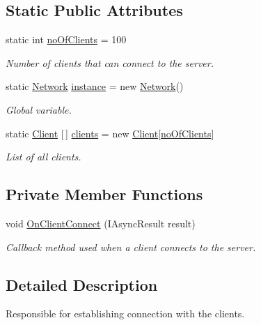 \subsection*{Static Public Attributes}
\begin{DoxyCompactItemize}
\item 
static int \mbox{\hyperlink{class_network_a728ae99fddeb1561e1e521d134d92582}{no\+Of\+Clients}} = 100
\begin{DoxyCompactList}\small\item\em Number of clients that can connect to the server. \end{DoxyCompactList}\item 
static \mbox{\hyperlink{class_network}{Network}} \mbox{\hyperlink{class_network_af63d25c25873f9220c94d6250a1c9242}{instance}} = new \mbox{\hyperlink{class_network}{Network}}()
\begin{DoxyCompactList}\small\item\em Global variable. \end{DoxyCompactList}\item 
static \mbox{\hyperlink{class_client}{Client}} \mbox{[}$\,$\mbox{]} \mbox{\hyperlink{class_network_a6c14090f7cbb47a16695fd832498d83a}{clients}} = new \mbox{\hyperlink{class_client}{Client}}\mbox{[}\mbox{\hyperlink{class_network_a728ae99fddeb1561e1e521d134d92582}{no\+Of\+Clients}}\mbox{]}
\begin{DoxyCompactList}\small\item\em List of all clients. \end{DoxyCompactList}\end{DoxyCompactItemize}
\subsection*{Private Member Functions}
\begin{DoxyCompactItemize}
\item 
void \mbox{\hyperlink{class_network_a15f803d40cbbf25b37d279f9637ec614}{On\+Client\+Connect}} (I\+Async\+Result result)
\begin{DoxyCompactList}\small\item\em Callback method used when a client connects to the server. \end{DoxyCompactList}\end{DoxyCompactItemize}


\subsection{Detailed Description}
Responsible for establishing connection with the clients. 



